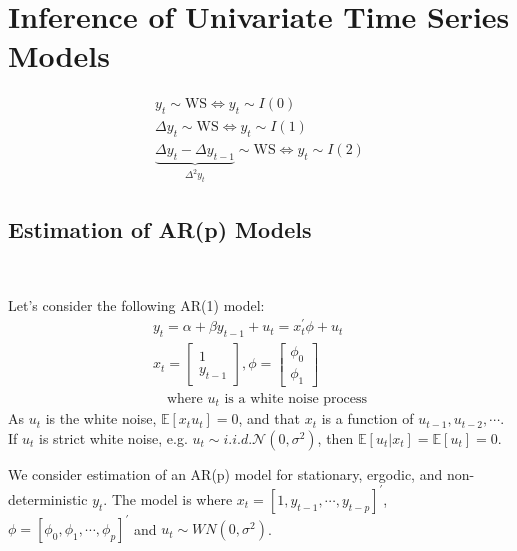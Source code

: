 \section{Inference of Univariate Time Series Models}
\label{sec:inference-univariate-time-series-models}

\begin{gather*}
    y_t \sim \text{WS} \Leftrightarrow y_t \sim I(0) \\
    \Delta y_t \sim \text{WS} \Leftrightarrow y_t \sim I(1) \\
    \underset{\Delta^2 y_t}{\underbrace{\Delta y_t - \Delta y_{t-1}}} \sim \text{WS} \Leftrightarrow y_t \sim I(2)
\end{gather*}

\subsection{Estimation of AR(p) Models}

\begin{eg}
    \

    Let's consider the following AR(1) model:
    \begin{gather*}
        y_t = \alpha + \beta y_{t-1} + u_t = x_t^{\prime} \phi + u_t\\
        x_t = \begin{bmatrix} 1 \\ y_{t-1} \end{bmatrix}, \phi = \begin{bmatrix} \phi_0 \\ \phi_1 \end{bmatrix} \\
        \quad \text{where } u_t \text{ is a white noise process}
    \end{gather*}
    As $u_t$ is the white noise, $\mathbb{E}[x_t u_t] = 0$, and that $x_t$ is a function of $u_{t-1}, u_{t-2}, \cdots$.
    If $u_t$ is strict white noise, e.g. $u_t \sim i.i.d. \mathcal{N}(0, \sigma^2)$, then $\mathbb{E}[u_t | x_t] = \mathbb{E}[u_t] = 0$.
\end{eg}


We consider estimation of an AR(p) model for stationary, ergodic, and non-deterministic $y_t$.
The model is where $x_t = [1, y_{t-1}, \cdots, y_{t-p}]^{\prime} $, $\phi = [\phi_0, \phi_1, \cdots, \phi_p]^{\prime} $
and $u_t \sim WN(0, \sigma^2)$.

